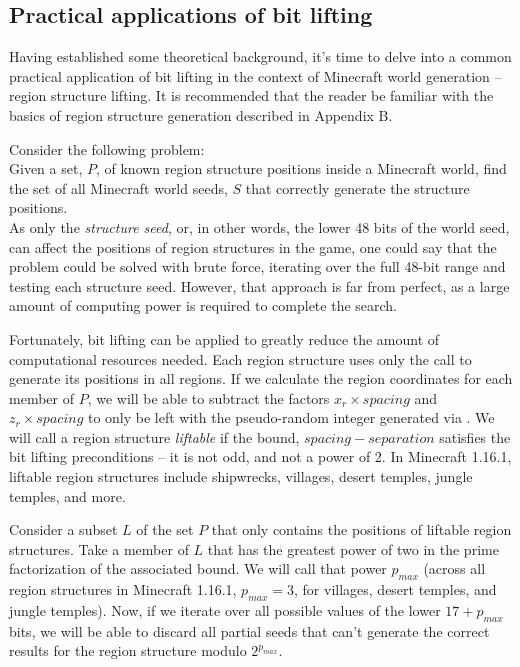 \documentclass{article}
\begin{document}
\subsection{Practical applications of bit lifting}
Having established some theoretical background, it's time to delve into a common practical application of bit lifting in the context of Minecraft world generation -- region structure lifting. It is recommended that the reader be familiar with the basics of region structure generation described in Appendix B.%

Consider the following problem: \\
Given a set, $P$, of known region structure positions inside a Minecraft world, find the set of all Minecraft world seeds, $S$ that correctly generate the structure positions. \\
As only the \emph{structure seed}, or, in other words, the lower 48 bits of the world seed, can affect the positions of region structures in the game, one could say that the problem could be solved with brute force, iterating over the full 48-bit range and testing each structure seed. However, that approach is far from perfect, as a large amount of computing power is required to complete the search. 

Fortunately, bit lifting can be applied to greatly reduce the amount of computational resources needed. Each region structure uses only the  call to generate its positions in all regions. If we calculate the region coordinates for each member of $P$, we will be able to subtract the factors $x_r \times spacing$ and $z_r \times spacing$ to only be left with the pseudo-random integer generated via . We will call a region structure \emph{liftable} if the bound, $spacing - separation$ satisfies the bit lifting preconditions -- it is not odd, and not a power of 2. In Minecraft 1.16.1, liftable region structures include shipwrecks, villages, desert temples, jungle temples, and more. 

Consider a subset $L$ of the set $P$ that only contains the positions of liftable region structures. Take a member of $L$ that has the greatest power of two in the prime factorization of the associated  bound. We will call that power $p_{max}$ (across all region structures in Minecraft 1.16.1, $p_{max} = 3$, for villages, desert temples, and jungle temples). Now, if we iterate over all possible values of the lower $17 + p_{max}$ bits, we will be able to discard all partial seeds that can't generate the correct  results for the region structure modulo $2^{p_{max}}$. 
\end{document}
